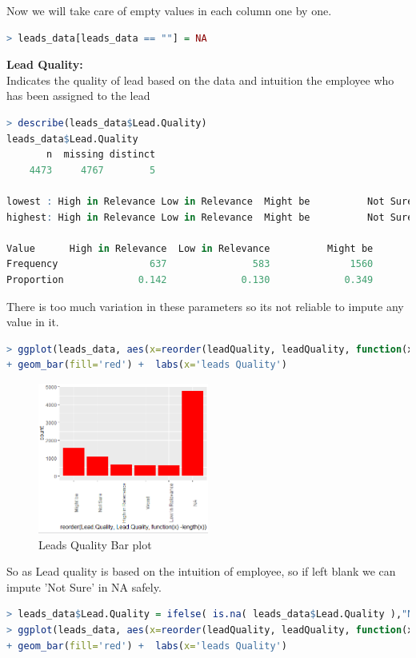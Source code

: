 Now we will take care of empty values in each column one by one.
\begin{lstlisting}[language=R]
> leads_data[leads_data == ""] = NA
\end{lstlisting}
\textbf{Lead Quality: }\\
Indicates the quality of lead based on the data and intuition the employee who has been assigned to the lead
\begin{lstlisting}[language=R]
> describe(leads_data$Lead.Quality)
leads_data$Lead.Quality 
       n  missing distinct 
    4473     4767        5 

lowest : High in Relevance Low in Relevance  Might be          Not Sure          Worst            
highest: High in Relevance Low in Relevance  Might be          Not Sure          Worst            
                    
Value      High in Relevance  Low in Relevance          Might be          Not Sure             Worst
Frequency                637               583              1560              1092               601
Proportion             0.142             0.130             0.349             0.244             0.134
\end{lstlisting}
There is too much variation in these parameters so its not reliable to impute any value in it.
\begin{lstlisting}[language=R]
> ggplot(leads_data, aes(x=reorder(leadQuality, leadQuality, function(x)-length(x)))) +
+ geom_bar(fill='red') +  labs(x='leads Quality')
\end{lstlisting}
\begin{figure}[ht]
    \centering
    \includegraphics[width=0.5\textwidth]{assets/lead_quality.png}
    \caption{ Leads Quality Bar plot}
\end{figure}
 So as Lead quality is based on the intuition of employee, so if left blank we can impute 'Not Sure' in NA safely.
\begin{lstlisting}[language=R]
> leads_data$Lead.Quality = ifelse( is.na( leads_data$Lead.Quality ),"Not Sure",leads_data$Lead.Quality)
> ggplot(leads_data, aes(x=reorder(leadQuality, leadQuality, function(x)-length(x)))) +
+ geom_bar(fill='red') +  labs(x='leads Quality')
\end{lstlisting}
